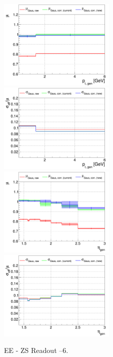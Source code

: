 \begin{figure}
\includegraphics[width=0.495\textwidth]{./plots_pdf/ECAL_plots/plotsNoPU/EE/pdf/ZS/GENPT/EEZS_GENPT_0000_0006_MuOverBins.pdf}
\includegraphics[width=0.495\textwidth]{./plots_pdf/ECAL_plots/plotsNoPU/EE/pdf/ZS/GENPT/EEZS_GENPT_0000_0006_EffSigmaOverBins.pdf}
\includegraphics[width=0.495\textwidth]{./plots_pdf/ECAL_plots/plotsNoPU/EE/pdf/ZS/GENETA/EEZS_GENETA_0000_0006_MuOverBins.pdf}
\includegraphics[width=0.495\textwidth]{./plots_pdf/ECAL_plots/plotsNoPU/EE/pdf/ZS/GENETA/EEZS_GENETA_0000_0006_EffSigmaOverBins.pdf}
\caption{EE - ZS Readout --6\GeV.}
\end{figure}

